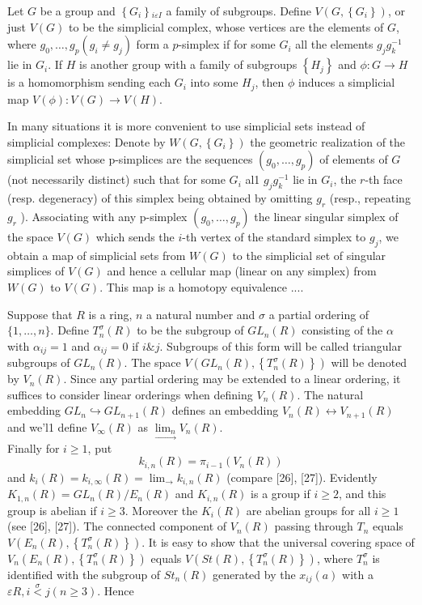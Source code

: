 Let $G$ be a group and $\left\{G_i\right\}{ }_{i \varepsilon I}$ a family of subgroups. Define $V\left(G,\left\{G_i\right\}\right)$, or just $V(G)$ to be the simplicial complex, whose vertices are the elements of $G$, where $g_0, \ldots, g_p\left(g_i \neq g_j\right)$ form a $p$-simplex if for some $G_i$ all the elements $g_j g_k^{-1}$ lie in $G_i$. If $H$ is another group with a family of subgroups $\left\{H_j\right\}$ and $\phi: G \rightarrow H$ is a homomorphism sending each $G_i$ into some $H_j$, then $\phi$ induces a simplicial map $V(\phi): V(G) \rightarrow V(H)$.

In many situations it is more convenient to use simplicial sets instead of simplicial complexes: Denote by $W\left(G,\left\{G_i\right\}\right)$ the geometric realization of the simplicial set whose p-simplices are the sequences $\left(g_0, \ldots, g_p\right)$ of elements of $G$ (not necessarily distinct) such that for some $G_i$ al1 $g_j g_k^{-1}$ lie in $G_i$, the $r$-th face (resp. degeneracy) of this simplex being obtained by omitting $g_r$ (resp., repeating $g_r$ ). Associating with any p-simplex $\left(g_0, \ldots, g_p\right)$ the linear singular simplex of the space $V(G)$ which sends the $i$-th vertex of the standard simplex to $g_j$, we obtain a map of simplicial sets from $W(G)$ to the simplicial set of singular simplices of $V(G)$ and hence a cellular map (linear on any simplex) from $W(G)$ to $V(G)$. This map is a homotopy equivalence .... %

Suppose that $R$ is a ring, $n$ a natural number and $\sigma$ a partial ordering of $\{1, \ldots, n\}$. Define $T_n^\sigma(R)$ to be the subgroup of $G L_n(R)$ consisting of the $\alpha$ with $\alpha_{i j}=1$ and $\alpha_{i j}=0$ if $i \& j$. Subgroups of this form will be called triangular subgroups of $G L_n(R)$. The space $V\left(G L_n(R),\left\{T_n^\sigma(R)\right\}\right)$ will be denoted by $V_n(R)$. Since any partial ordering may be extended to a linear ordering, it suffices to consider linear orderings when defining $V_n(R)$. The natural embedding $G L_n \hookrightarrow G L_{n+1}(R)$ defines an embedding $V_n(R) \longleftrightarrow V_{n+1}(R)$ and we'l1 define $V_{\infty}(R)$ as $\underset{\rightarrow}{\lim _n} V_n(R)$. \\
Finally for $i \geq 1$, put $$k_{i, n}(R)=\pi_{i-1}\left(V_n(R)\right)$$ and $k_i(R)=k_{i, \infty}(R)=\lim _{\rightarrow} k_{i, n}(R)$ (compare [26], [27]). Evidently $K_{1, n}(R)=G L_n(R) / E_n(R)$ and $K_{i, n}(R)$ is a group if $i \geq 2$, and this group is abelian if $i \geq 3$. Moreover the $K_i(R)$ are abelian groups for all $i \geq 1$ (see [26], [27]). The connected component of $V_n(R)$ passing through $T_n$ equals $V\left(E_n(R),\left\{T_n^\sigma(R)\right\}\right)$. It is easy to show that the universal covering space of $V_n\left(E_n(R),\left\{T_n^\sigma(R)\right\}\right)$ equals $V\left(S t(R),\left\{T_n^\sigma(R)\right\}\right)$, where $T_n^\sigma$ is identified with the subgroup of $S t_n(R)$ generated by the $x_{i j}(a)$ with a $\varepsilon R, i \stackrel{\sigma}{<} j(n \geq 3)$. Hence

